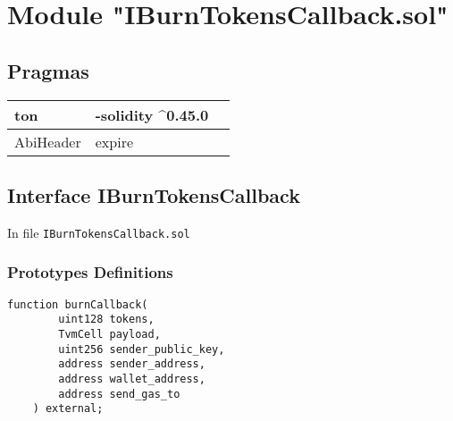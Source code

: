 
\section{Module "IBurnTokensCallback.sol"}


\subsection{Pragmas}


\noindent\begin{tabular}{|l|l|p{5cm}|}\hline
ton & -solidity \^{}0.45.0 &\\\hline
AbiHeader &  expire &\\\hline
\end{tabular}


\subsection{Interface IBurnTokensCallback}


In file {\tt IBurnTokensCallback.sol}

\subsubsection{Prototypes Definitions}

\vspace{2cm}

\begin{lstlisting}[firstnumber=6]
    function burnCallback(
        uint128 tokens,
        TvmCell payload,
        uint256 sender_public_key,
        address sender_address,
        address wallet_address,
        address send_gas_to
    ) external;
\end{lstlisting}
